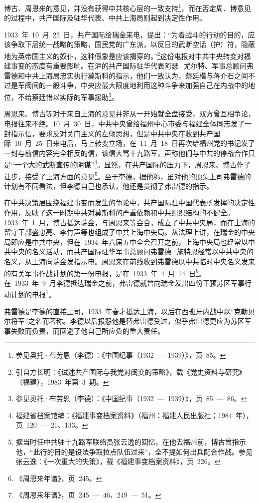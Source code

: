 博古、周恩来的意见，并没有获得中共核心层的一致支持\footnote{参见奥托·布劳恩（李德）：《中国纪事（1932~—~1939）》，页~85。}，而在否定周、博意见的过程中，共产国际及驻华代表、中共上海局则起到决定性作用。

1933~年~10~月~25~日，共产国际给瑞金来电，提出：“为着战斗的行动的目的，应该争取下层统一战略的策略，国民党的广东派，以反日的武断空话（护）符，隐蔽地为英帝国主义的奴仆，这种假象是应该揭穿的。”\footnote{引自方长明：《试述共产国际与我党对闽变的策略》，载《党史资料与研究》（福建），1983~年第~3~期。}这份电报对中共中央转变对福建事变的态度有重要影响。在沪的共产国际驻华代表阿瑟·尤尔特、军事总顾问弗雷德和中共上海局忠实执行莫斯科的指示，他们一致认为，蔡廷楷与蒋介石之间不过是军阀间的一般斗争，中央应最大限度地利用这种斗争来加强自己在内战中的地位，不给蔡廷惜以实际的军事援助\footnote{参见奥托·布劳恩（李德）：《中国纪事（1932~—~1939）》，页~85~—~86。}。

周恩来、博古等对于来自上海的意见并非从一开始就全盘接受，双方曾互相争论，电报往来不绝。10~月~30~日，中共中央曾给福州中心市委与福建全体同志发了一封指示信，要求反对关门主义的左倾思想，但是中共中央在收到共产国际~10~月~25~日来电后，马上转变立场，在~11~月~18~日再次给福州党的书记发了一封与前信内容完全相反的信，该信大骂十九路军，声称他们与中共的停战合作只是“一个大的武断宣传的阴谋”\footnote{福建省档案馆编：《福建事变档案资料》（福州：福建人民出版社；1984~年），页~120~—~21、133。}。显然，在共产国际的压力下，周恩来、博古作了让步，接受了上海方面的意见\footnote{据当时任中共驻十九路军联络员张云逸的回忆，在他去福州前，博古曾指示他，“此行的目的是设法争取拉点队伍过来”，全不提如何出兵配合作战。参见张云逸：《一次重大的失策》，载《福建事变档案资料》，页~226。}。至于李德，据他称，虽对他的顶头上司弗雷德的计划有不同看法，但李德自己也承认，他还是贯彻了弗雷德的指示。

在中共决策层围绕福建事变而发生的争论中，共产国际驻中国代表所发挥的决定性作用，反映了这一时期中共对莫斯科的严重依赖和中共组织结构的不健全。1933~年~1~月，博古抵达瑞金，与周恩来等会合，成立了中共中央局，而在上海的留守干部盛忠亮、李竹声等也组成了中共上海中央局。从法理上讲，在瑞金的中央局即应是中共中央，但在~1934~年六届五中全会召开之前，上海中央局也经常以中共中央的名义活动，而共产国际驻华军事总顾问弗雷德·施特恩经常以中共中央的名义，从上海向瑞金发指示电。周恩来在前线收到弗雷德以中共临时中央名义发来的有关军事作战计划的第一份电报，是在~1933~年~4~月~14~日\footnote{《周恩来年谱》，页~245。}。在~1933~年~9~月李德抵达瑞金之前，弗雷德就曾向瑞金发出四份干预苏区军事行动计划的电报\footnote{《周恩来年谱》，页~245~—~46、249~—~51。}。

弗雷德是李德的直接上司，1933~年春才抵达上海，以后在西班牙内战中以“克勒贝尔将军”之名而著称。李德以后报怨他是替弗雷德受过，似乎弗雷德更应为苏区军事失败而负责，而回避了他自己所应负的重大责任。

